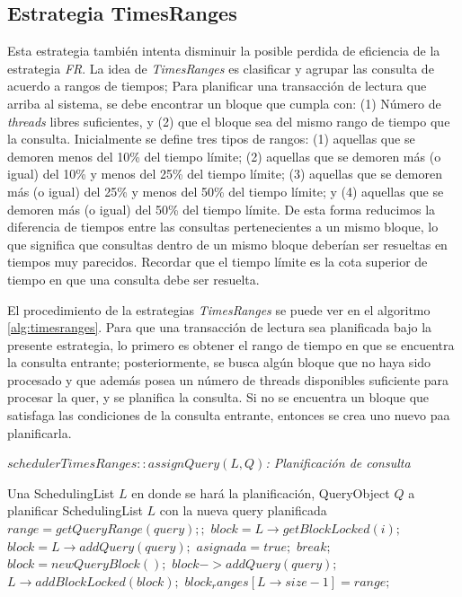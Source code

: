 \subsection{Estrategia TimesRanges}
\label{scheduling:timesranges}
Esta estrategia también intenta disminuir la posible perdida de eficiencia de la estrategia \textit{FR}. La idea de \textit{TimesRanges} es clasificar y agrupar las consulta de acuerdo a rangos de tiempos; Para planificar una transacción de lectura que arriba al sistema, se debe encontrar un bloque que cumpla con: (1) Número de \textit{threads} libres suficientes, y (2) que el bloque sea del mismo rango de tiempo que la consulta. Inicialmente se define tres tipos de rangos: (1) aquellas que se demoren menos del 10\% del tiempo límite; (2) aquellas que se demoren más (o igual) del 10\% y menos del 25\% del tiempo límite; (3) aquellas que se demoren más (o igual) del 25\% y menos del 50\% del tiempo límite; y (4) aquellas que se demoren más (o igual) del 50\% del tiempo límite. De esta forma reducimos la diferencia de tiempos entre las consultas pertenecientes a un mismo bloque, lo que significa que consultas dentro de un mismo bloque deberían ser resueltas en tiempos muy parecidos. Recordar que el tiempo límite es la cota superior de tiempo en que una consulta debe ser resuelta.

El procedimiento de la estrategias \textit{TimesRanges} se puede ver en el algoritmo \ref{alg:timesranges}. Para que una transacción de lectura sea planificada bajo la presente estrategia, lo primero es obtener el rango de tiempo en que se encuentra la consulta entrante; posteriormente, se busca algún bloque que no haya sido procesado y que además posea un número de threads disponibles suficiente para procesar la quer, y se planifica la consulta. Si no se encuentra un bloque que satisfaga las condiciones de la consulta entrante, entonces se crea uno nuevo paa planificarla. 

\begin{algorithm}[!th]
\caption{\em $schedulerTimesRanges::assignQuery(L, Q)$: Planificación de consulta}
\label{alg:timesranges}
\begin{algorithmic}[1]
\REQUIRE Una SchedulingList $L$ en donde se hará la planificación, QueryObject $Q$ a planificar
\ENSURE SchedulingList $L$ con la nueva query planificada	
	\STATE $range = getQueryRange(query);;$		
		\STATE $block = L \rightarrow getBlockLocked(i);$	
			\STATE $block = L \rightarrow addQuery(query);$
			\STATE $asignada = true;$
			\STATE $break;$	
		\ENDIF
	\ENDFOR
		\STATE $block = new QueryBlock();$	
		\STATE $block->addQuery(query);$	
		\STATE $L \rightarrow addBlockLocked(block);$
		\STATE $block_ranges[L \rightarrow size - 1] = range;$	
	\ENDIF
\end{algorithmic}
\end{algorithm}


